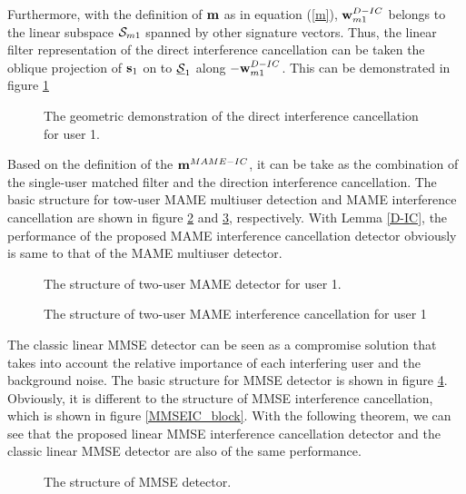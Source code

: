 \documentclass[a4paper,12pt,fleqn]{article}
\newcommand{\bs}{{\bf s}}
\newcommand{\bm}{{\bf m}}
\newcommand{\bw}{{\bf w}}
\begin{document}
Furthermore, with the definition of $\bm$ as in equation
(\ref{m}), $\bw_{m1}^{D-IC}$ belongs to the linear subspace
$\mathbf{\cal S}_{m1}$ spanned by other signature vectors. Thus,
the linear filter representation of the direct interference
cancellation can be taken the oblique projection of $\bs_1$ on to
$\underline{\mathbf{\cal S}}_1$ along $-\bw_{m1}^{D-IC}$. This can
be demonstrated in figure \ref{DIC}


\begin{figure}
\caption{The geometric demonstration of the direct interference
cancellation for user 1.} \label{DIC}
\end{figure}


Based on the definition of the $\bm^{MAME-IC}$, it can be take as
the combination of the single-user matched filter and the
direction interference cancellation. The basic structure for
tow-user MAME multiuser detection and MAME interference
cancellation are shown in figure \ref{MAME_block} and
\ref{MAMEIC_block}, respectively. With Lemma \ref{D-IC}, the
performance of the proposed MAME interference cancellation
detector obviously is same to that of the MAME multiuser detector.

\begin{figure}
\caption{The structure of two-user MAME detector for user 1.}
\label{MAME_block}
\end{figure}

\begin{figure}
\caption{The structure of two-user MAME interference cancellation
for user 1} \label{MAMEIC_block}
\end{figure}


The classic linear MMSE detector can be seen as a compromise
solution that takes into account the relative importance of each
interfering user and the background noise. The basic structure for
MMSE detector is shown in figure \ref{MMSE_block}. Obviously, it
is different to the structure of MMSE interference cancellation,
which is shown in figure \ref{MMSEIC_block}. With the following
theorem, we can see that the proposed linear MMSE interference
cancellation detector and the classic linear MMSE detector are
also of the same performance.


\begin{figure}
\caption{The structure of MMSE detector.} \label{MMSE_block}
\end{figure}
\end{document}
